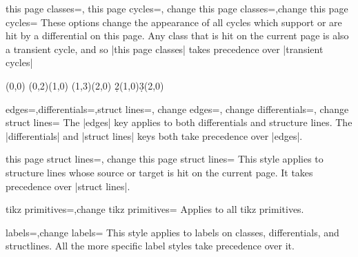 \documentclass{ltxdoc}
\begin{document}
\begin{sseqdata}[name=ex1,degree={#1}{1-#1}]
\begin{keylist}{this page classes=, this page cycles=, change this page classes=,change this page cycles=}
These options change the appearance of all cycles which support or are hit by a differential on this page. Any class that is hit on the current page is also a transient cycle, and so |this page classes| takes precedence over |transient cycles|
\begin{codeexample}[width=6cm]
\begin{sseqdata}[name=this page cycles example,Adams grading,
                 transient cycles={red,fill},this page cycles={blue}]
\class(0,0)
\class(0,2)\class(1,0)
\class(1,3)\class(2,0)
\d2(1,0)\d3(2,0)
\end{sseqdata}
\printpage[name=this page cycles example,page=2]
\hskip1cm
\printpage[name=this page cycles example,page=3]
\end{codeexample}
\end{keylist}

\begin{keylist}{edges=,differentials=,struct lines=, change edges=, change differentials=, change struct lines=}
The |edges| key applies to both differentials and structure lines. The |differentials| and |struct lines| keys both take precedence over |edges|.
\end{keylist}

\begin{keylist}{this page struct lines=, change this page struct lines=}
This style applies to structure lines whose source or target is hit on the current page. It takes precedence over |struct lines|.
\end{keylist}

\begin{keylist}{tikz primitives=,change tikz primitives=}
Applies to all tikz primitives.
\end{keylist}


\begin{keylist}{labels=,change labels=}
This style applies to labels on classes, differentials, and structlines. All the more specific label styles take precedence over it.
\end{keylist}


\end{sseqdata}
\end{document}
